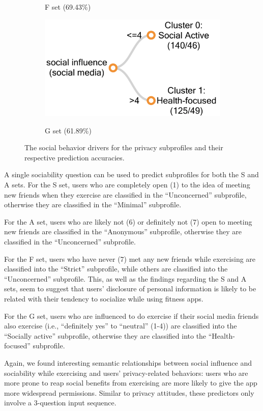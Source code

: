 \begin{figure}
\begin{subfigure}[b]{0.4\linewidth}
		\label{fig:ftree3}
		\caption{F set (69.43\%)}
	\end{subfigure} 
	\begin{subfigure}[b]{0.4\linewidth} 
		\includegraphics[width=0.5\linewidth]{figures/g_tree3new.png}
		\label{fig:gtree3}
		\caption{G set (61.89\%)}
	\end{subfigure}
	\caption{The social behavior drivers for the privacy subprofiles and their respective prediction accuracies.}
	\label{fig:tree3}
\end{figure}


A single sociability question can be used to predict subprofiles for both the S and A sets. For the S set, users who are completely open (1) to the idea of meeting new friends when they exercise are classified in the ``Unconcerned'' subprofile, otherwise they are classified in the ``Minimal'' subprofile.

For the A set, users who are likely not (6) or definitely not (7) open to meeting new friends are classified in the ``Anonymous'' subprofile, otherwise they are classified in the ``Unconcerned'' subprofile.

For the F set, users who have never (7) met any new friends while exercising are classified into the ``Strict'' subprofile, while others are classified into the ``Unconcerned'' subprofile. This, as well as the findings regarding the S and A sets, seem to suggest that users'  disclosure of personal information is likely to be related with their tendency to socialize while using fitness apps.

For the G set, users who are influenced to do exercise if their social media friends also exercise (i.e., ``definitely yes'' to ``neutral'' (1-4)) are classified into the ``Socially active'' subprofile, otherwise they are classified into the ``Health-focused'' subprofile.

Again, we found interesting semantic relationships between social influence and sociability while exercising and users' privacy-related behaviors: users who are more prone to reap social benefits from exercising are more likely to give the app more widespread permissions. Similar to privacy attitudes, these predictors only involve a 3-question input sequence.


